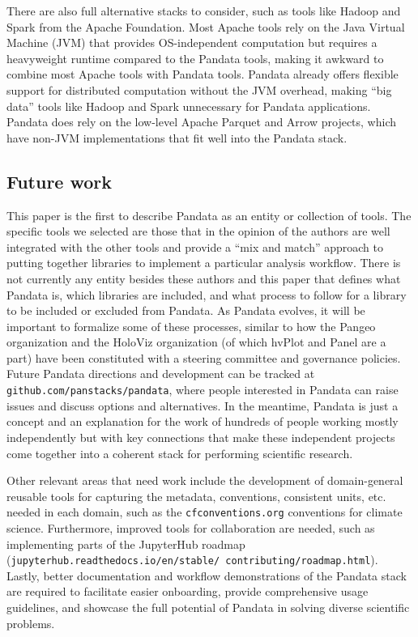 There are also full alternative stacks to consider, such as tools like Hadoop \cite{white:hadoop15} and Spark \cite{zaharia:cacm16} from the Apache Foundation. Most Apache tools rely on the Java Virtual Machine (JVM) that provides OS-independent computation but requires a heavyweight runtime compared to the Pandata tools, making it awkward to combine most Apache tools with Pandata tools. Pandata already offers flexible support for distributed computation without the JVM overhead, making ``big data'' tools like Hadoop and Spark unnecessary for Pandata applications. Pandata does rely on the low-level Apache Parquet and Arrow projects, which have non-JVM implementations that fit well into the Pandata stack.

\subsection{Future work}
This paper is the first to describe Pandata as an entity or collection of tools. The specific tools we selected are those that in the opinion of the authors are well integrated with the other tools and provide a ``mix and match'' approach to putting together libraries to implement a particular analysis workflow. There is not currently any entity besides these authors and this paper that defines what Pandata is, which libraries are included, and what process to follow for a library to be included or excluded from Pandata. As Pandata evolves, it will be important to formalize some of these processes, similar to how the Pangeo organization and the HoloViz organization (of which hvPlot and Panel are a part) have been constituted with a steering committee and governance policies. Future Pandata directions and development can be tracked at \texttt{github.com/panstacks/pandata}, where people interested in Pandata can raise issues and discuss options and alternatives. In the meantime, Pandata is just a concept and an explanation for the work of hundreds of people working mostly independently but with key connections that make these independent projects come together into a coherent stack for performing scientific research.

Other relevant areas that need work include the development of domain-general reusable tools for capturing the metadata, conventions, consistent units, etc. needed in each domain, such as the \texttt{cfconventions.org} conventions for climate science. Furthermore, improved tools for collaboration are needed, such as implementing parts of the JupyterHub roadmap (\texttt{jupyterhub.readthedocs.io/en/stable/ contributing/roadmap.html}). Lastly, better documentation and workflow demonstrations of the Pandata stack are required to facilitate easier onboarding, provide comprehensive usage guidelines, and showcase the full potential of Pandata in solving diverse scientific problems.


